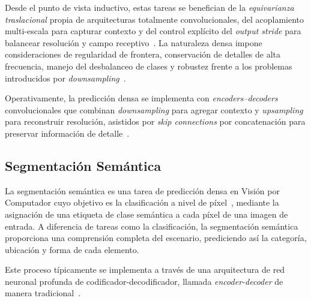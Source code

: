 Desde el punto de vista inductivo, estas tareas se benefician de la \textit{equivarianza traslacional} propia de arquitecturas totalmente convolucionales, del acoplamiento multi-escala para capturar contexto y del control explícito del \textit{output stride} para balancear resolución y campo receptivo~\cite{ liu2022convnext, khan2022transformersvision}. La naturaleza densa impone consideraciones de regularidad de frontera, conservación de detalles de alta frecuencia, manejo del desbalanceo de clases y robustez frente a los problemas introducidos por \textit{downsampling}~\cite{cai2023efficientvit, xiao2018upernet, ji2022automation}.

Operativamente, la predicción densa se implementa con \textit{encoders–decoders} convolucionales que combinan \textit{downsampling} para agregar contexto y \textit{upsampling} para reconstruir resolución, asistidos por \textit{skip connections} por concatenación para preservar información de detalle~\cite{ronneberger2015unet, bala2025visiontranscoder, badrinarayanan2016segnet}.

\subsection{Segmentación Semántica}
La segmentación semántica es una tarea de predicción densa en Visión por Computador cuyo objetivo es la clasificación a nivel de píxel~\cite{bala2025visiontranscoder, ji2022automation}, mediante la asignación de una etiqueta de clase semántica a cada píxel de una imagen de entrada. A diferencia de tareas como la clasificación, la segmentación semántica proporciona una comprensión completa del escenario, prediciendo así la categoría, ubicación y forma de cada elemento.

Este proceso típicamente se implementa a través de una arquitectura de red neuronal profunda de codificador-decodificador, llamada \textit{encoder-decoder} de manera tradicional~\cite{ji2022automation, neloy2024autoencoders, bala2025visiontranscoder}.

